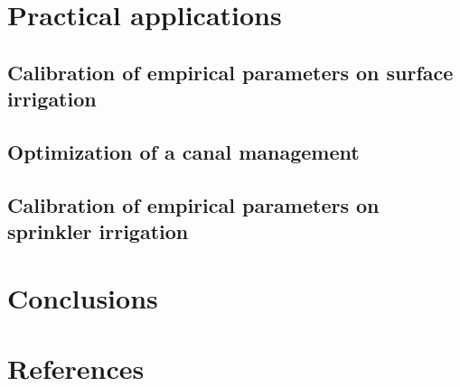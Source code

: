 \documentclass[review,authoryear]{elsarticle}
\begin{document}
\section{Practical applications}

\subsection{Calibration of empirical parameters on surface irrigation}

\subsection{Optimization of a canal management}

\subsection{Calibration of empirical parameters on sprinkler irrigation}

\section{Conclusions}

\section*{References}

\end{document}
